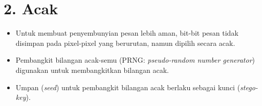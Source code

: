 \documentclass{article}
\begin{document}

\section*{2. Acak}

\begin{itemize}
    \item Untuk membuat penyembunyian pesan lebih aman, bit-bit pesan tidak disimpan pada pixel-pixel yang berurutan, namun dipilih secara acak.
    \item Pembangkit bilangan acak-semu (PRNG: \textit{pseudo-random number generator}) digunakan untuk membangkitkan bilangan acak.
    \item Umpan (\textit{seed}) untuk pembangkit bilangan acak berlaku sebagai kunci (\textit{stego-key}).
\end{itemize}
\end{document}
